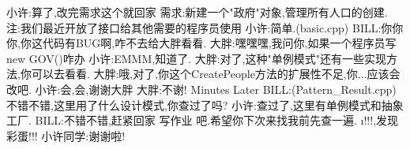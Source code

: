 \enter
小许:算了,改完需求这个就回家\enter
需求:新建一个"政府"对象,管理所有人口的创建.\enter
注:我们最近开放了接口给其他需要的程序员使用\enter
\enter
小许:简单.(basic.cpp)\enter
BILL:你你你,你这代码有BUG啊,咋不去给大胖看看.\enter
\enter
大胖:嘿嘿嘿,我问你,如果一个程序员写 new GOV()咋办\enter
小许:EMMM,知道了.\enter
大胖:对了,这种"单例模式"还有一些实现方法,你可以去看看.\enter
\enter
大胖:哦,对了,你这个CreatePeople方法的扩展性不足,你...应该会改吧.\enter
小许:会,会,谢谢大胖\enter
大胖:不谢!\enter
{} Minutes Later\enter
\enter
BILL:(Pattern\_Result.cpp)不错不错,这里用了什么设计模式,你查过了吗?\enter
小许:查过了,这里有单例模式和抽象工厂.\enter
BILL:不错不错,赶紧回家 写作业 吧.希望你下次来找我前先查一遍.\enter
{\i!!!,发现彩蛋!!!}\enter
小许同学:谢谢啦!\enter



